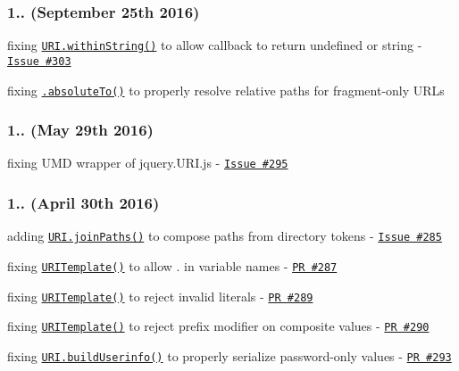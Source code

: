 \subsubsection*{1.. (September 25th 2016)}


\begin{DoxyItemize}
\item fixing \href{http://medialize.github.io/URI.js/docs.html#static-withinString}{\tt {\ttfamily U\+R\+I.\+within\+String()}} to allow callback to return {\ttfamily undefined} or {\ttfamily string} -\/ \href{https://github.com/medialize/URI.js/issues/303}{\tt Issue \#303}
\item fixing \href{http://medialize.github.io/URI.js/docs.html#absoluteto}{\tt {\ttfamily .absolute\+To()}} to properly resolve relative paths for fragment-\/only U\+R\+Ls
\end{DoxyItemize}

\subsubsection*{1.. (May 29th 2016)}


\begin{DoxyItemize}
\item fixing U\+MD wrapper of {\ttfamily jquery.\+U\+R\+I.\+js} -\/ \href{https://github.com/medialize/URI.js/issues/295}{\tt Issue \#295}
\end{DoxyItemize}

\subsubsection*{1.. (April 30th 2016)}


\begin{DoxyItemize}
\item adding \href{http://medialize.github.io/URI.js/docs.html#static-joinPaths}{\tt {\ttfamily U\+R\+I.\+join\+Paths()}} to compose paths from directory tokens -\/ \href{https://github.com/medialize/URI.js/issues/285}{\tt Issue \#285}
\item fixing \href{http://medialize.github.io/URI.js/uri-template.html}{\tt {\ttfamily U\+R\+I\+Template()}} to allow {\ttfamily .} in variable names -\/ \href{https://github.com/medialize/URI.js/pull/287}{\tt PR \#287}
\item fixing \href{http://medialize.github.io/URI.js/uri-template.html}{\tt {\ttfamily U\+R\+I\+Template()}} to reject invalid literals -\/ \href{https://github.com/medialize/URI.js/pull/289}{\tt PR \#289}
\item fixing \href{http://medialize.github.io/URI.js/uri-template.html}{\tt {\ttfamily U\+R\+I\+Template()}} to reject prefix modifier on composite values -\/ \href{https://github.com/medialize/URI.js/pull/290}{\tt PR \#290}
\item fixing \href{http://medialize.github.io/URI.js/docs.html#static-buildUserinfo}{\tt {\ttfamily U\+R\+I.\+build\+Userinfo()}} to properly serialize password-\/only values -\/ \href{https://github.com/medialize/URI.js/pull/293}{\tt PR \#293}
\end{DoxyItemize}

